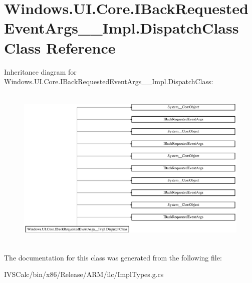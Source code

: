 \hypertarget{class_windows_1_1_u_i_1_1_core_1_1_i_back_requested_event_args_____impl_1_1_dispatch_class}{}\section{Windows.\+U\+I.\+Core.\+I\+Back\+Requested\+Event\+Args\+\_\+\+\_\+\+Impl.\+Dispatch\+Class Class Reference}
\label{class_windows_1_1_u_i_1_1_core_1_1_i_back_requested_event_args_____impl_1_1_dispatch_class}
Inheritance diagram for Windows.\+U\+I.\+Core.\+I\+Back\+Requested\+Event\+Args\+\_\+\+\_\+\+Impl.\+Dispatch\+Class\+:\begin{figure}[H]
\begin{center}
\leavevmode
\includegraphics[height=7.917737cm]{class_windows_1_1_u_i_1_1_core_1_1_i_back_requested_event_args_____impl_1_1_dispatch_class}
\end{center}
\end{figure}


The documentation for this class was generated from the following file\+:\begin{DoxyCompactItemize}
\item 
I\+V\+S\+Calc/bin/x86/\+Release/\+A\+R\+M/ilc/Impl\+Types.\+g.\+cs\end{DoxyCompactItemize}
